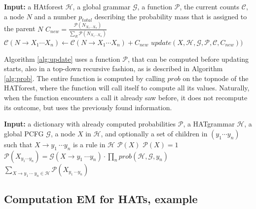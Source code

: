 \documentclass{article}
\newcommand{\G}{\mathcal{G}}
\newcommand{\Hg}{\mathcal{H}}
\newcommand{\C}{\mathcal{C}}
\newcommand{\Pp}{\mathcal{P}}
\begin{document}
\begin{algorithm}
\caption{$update(N,\Hg,\G,\Pp,\C,p_{total})$}\label{alg:update}
\begin{algorithmic}
\STATE \textbf{Input:} a HAtforest $\Hg$, a global grammar $\G$, a function $\Pp$, the current counts $\C$, a node $N$ and a number $p_{total}$ describing the probability mass that is assigned to the parent $N$
\STATE
\IF{$\neg \exists N\rightarrow X_1~\cdots X_n\in\Hg$}
	\RETURN
\ENDIF
\FOR{$R = N\rightarrow X_1~\cdots X_n\in\Hg$}
	\STATE $C_{new} = \frac{\Pp(N_{X_1\cdots X_n})}{\sum_{R} \Pp(N_{X_1\cdots X_n})}$
	\STATE $\C(N\rightarrow X_1\cdots X_n) \leftarrow \C(N\rightarrow X_1\cdots X_n) + C_{new}  $
		\STATE $update(X,\Hg,\G,\Pp,\C,C_{new}))$
	\ENDFOR
\ENDFOR
\end{algorithmic}
\end{algorithm}

Algorithm \ref{alg:update} uses  a function $\Pp$, that can be computed before updating starts, also in a top-down recursive fashion, as is described in Algorithm \ref{alg:prob}. The entire function is computed by calling $prob$ on the topnode of the HATforest, where the function will call itself to compute all its values. Naturally, when the function encounters a call it already saw before, it does not recompute its outcome, but uses the previously found information.

\begin{algorithm}[!ht]
\caption{$prob(\Pp, \Hg,\G,X,(y_1,\cdots,y_n) = None$)}\label{alg:prob}
\begin{algorithmic}
\STATE \textbf{Input:} a dictionary with already computed probabilities $\Pp$, a HATgrammar $\Hg$, a global PCFG $\G$, a node $X$ in $\Hg$, and optionally a set of children in $(y_1\cdots y_n)$ such that $X\rightarrow y_1~\cdots y_n$ is a rule in $\Hg$
\STATE
\IF{$X \in \Pp$}
	\RETURN $\Pp(X)$
	\STATE
\ELSIF{$\neg\exists X\rightarrow C_1~\cdots ~C_N \in\Hg$}
	\RETURN $\Pp(X)=1$
	\STATE
{}
	\RETURN $\Pp(X_{y_1\cdots y_n}) = \G(X\rightarrow y_1~\cdots y_n)\cdot\prod_{n}prob(\Hg,\G,y_n)$
	\STATE
\ELSE
	\RETURN $\sum_{X\rightarrow y_1~\cdots ~y_n \in\Hg} \Pp(X_{y_1~\cdots y_n})$
	\STATE
\ENDIF
\end{algorithmic}
\end{algorithm}

\subsection{Computation EM for HATs, example}
\end{document}
